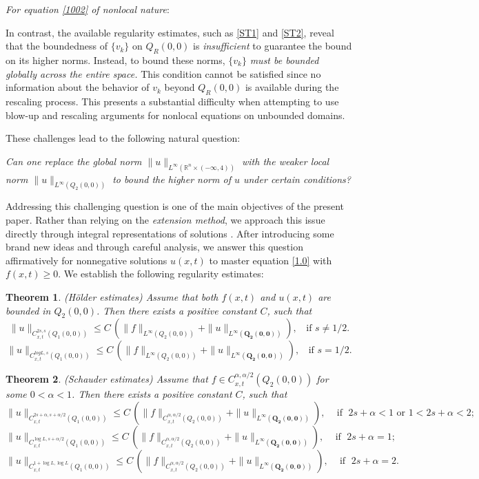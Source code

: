 \documentclass[12pt]{article}
\newtheorem{mthm}{Theorem}
\theoremstyle{remark}
\numberwithin{equation}{section}
\newcommand{\R}{\mathbb{R}}
\begin{document}
{\em For equation   \eqref{1002} of nonlocal nature}:

In contrast, the available regularity estimates, such as   \eqref{ST1} and \eqref{ST2}, reveal that the boundedness of $\{v_k\}$ on $Q_R(0,0)$ is {\em insufficient} to guarantee the bound on its higher norms. Instead, to bound these norms, $\{v_k\}$ {\em must be bounded globally across the entire
space.} This condition cannot be satisfied since no  information about the behavior of $v_k$ beyond $Q_R(0,0)$ is available during the rescaling process. This presents  a substantial difficulty when attempting to use blow-up and rescaling arguments for nonlocal equations on unbounded domains.


These challenges lead to the following natural question:

{\em Can one replace  the  global norm $\|u\|_{L^\infty (\R^n \times (-\infty, 4))}$  with the weaker local norm $\|u\|_{L^\infty (Q_2(0,0))}$ to bound the higher norm of $u$ under certain conditions? }
\smallskip

Addressing this challenging question is one of the main objectives of the present paper. Rather than relying on the {\em extension method}, we approach this issue directly through integral representations of solutions . After introducing some brand new ideas and through careful analysis, we answer this question affirmatively for nonnegative solutions $u(x,t)$ to master equation \eqref{1.0} with  $f(x,t)\geq 0$. We establish the following regularity estimates:
\begin{mthm} (H\"{o}lder estimates) \label{mthmu1} Assume that both $f(x,t)$ and $u(x,t)$ are bounded in $Q_2(0,0)$. Then there exists a positive constant $C$, such that
$$
\|u\|_{C^{2s, s}_{x, t} (Q_1(0,0))} \leq C \, \left( \|f\|_{L^\infty (Q_2(0,0))} + \|u\|_{L^\infty (\mathbf{Q_2(0,0)})}\right), \;\; \mbox{ if } s \neq 1/2.
$$
$$
\|u\|_{C^{log L, s}_{x, t} (Q_1(0,0))} \leq C \, \left( \|f\|_{L^\infty (Q_2(0,0))} + \|u\|_{L^\infty (\mathbf{Q_2(0,0)})} \right), \;\; \mbox{ if } s = 1/2.
$$
\end{mthm}

\begin{mthm} (Schauder estimates) \label{mthmu2} Assume that $f \in C^{\alpha, \alpha/2}_{x,t}  (Q_2(0,0))$ for some $0 < \alpha < 1$. Then there exists a positive constant $C$, such that
$$
\|u\|_{C^{2s+ \alpha, s+\alpha/2}_{x, t} (Q_1(0,0))} \leq C \, \left(\|f\|_{C^{\alpha, \alpha/2}_{x,t}  (Q_2(0,0))} + \|u\|_{L^\infty (\mathbf{Q_2(0,0)})} \right), \; \; \; \mbox{ if } \; 2s +\alpha < 1 \mbox{ or } 1< 2s +\alpha < 2;
$$
$$
\|u\|_{C^{\log L, s+\alpha/2}_{x, t} (Q_1(0,0))} \leq C \, \left(\|f\|_{C^{\alpha, \alpha/2}_{x,t}  (Q_2(0,0))} + \|u\|_{L^\infty (\mathbf{Q_2(0,0)})} \right), \; \; \; \mbox{ if } \; 2s + \alpha = 1;
$$
$$
\|u\|_{C^{1+\log L, \log L}_{x, t} (Q_1(0,0))} \leq C \, \left(\|f\|_{C^{\alpha, \alpha/2}_{x,t}  (Q_2(0,0))} + \|u\|_{L^\infty (\mathbf{Q_2(0,0)})} \right), \;\;\; \mbox{ if } \; 2s + \alpha = 2.
$$
\end{mthm}
\end{document}
